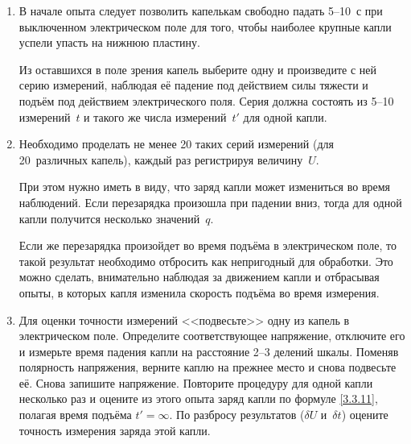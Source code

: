 \begin{lab:task}
\begin{enumerate}
Для уменьшения ошибок в определении~$t$ и~$t'$ нужно для пуска и остановки
секундомера использовать один и тот же признак~--- всегда нажимать 
кнопку секундомера либо в тот момент, когда капля скрывается за линией шкалы, либо,
наоборот, когда она появляется из-за линии. Рекомендуется следить за каплей, не
отрываясь от окуляра микроскопа, так как в противном случае легко её потерять из
виду и весь эксперимент придётся повторить.

\item В начале опыта следует позволить капелькам свободно падать 5--10~с 
при выключенном электрическом поле для того, чтобы наиболее крупные
капли успели упасть на нижнюю пластину.

Из оставшихся в поле зрения капель выберите одну и произведите с ней серию
измерений, наблюдая её падение под действием силы тяжести и подъём под действием
электрического поля. Серия должна состоять из 5--10 измерений~$t$ и такого
же числа измерений~$t'$ для одной капли.

\item Необходимо проделать не менее 20 таких серий измерений (для 20~различных
капель), каждый раз регистрируя величину~$U$. 

При этом нужно иметь в виду, что заряд капли может измениться во время наблюдений.
Если перезарядка произошла при падении вниз, тогда для одной
капли получится несколько значений~$q$.

Если же перезарядка произойдет во время подъёма в электрическом поле,
то такой результат необходимо отбросить как непригодный для обработки. 
Это можно сделать, внимательно наблюдая за движением капли и отбрасывая опыты, 
в которых капля изменила скорость подъёма во время измерения.

\item Для оценки точности измерений <<подвесьте>> одну из капель в электрическом
поле. Определите соответствующее напряжение, отключите его  и измерьте время
падения капли на расстояние 2--3 делений шкалы. Поменяв полярность
напряжения, верните каплю на прежнее место и снова подвесьте её. Снова запишите
напряжение. Повторите  процедуру  для одной капли несколько раз и 
оцените из этого опыта заряд капли по формуле \eqref{3.3.11}, полагая время
подъёма $t'=\infty$. 
По разбросу результатов ($\delta U$ и~$\delta t$) оцените
точность измерения заряда этой капли.

\end{enumerate}



\end{lab:task}
